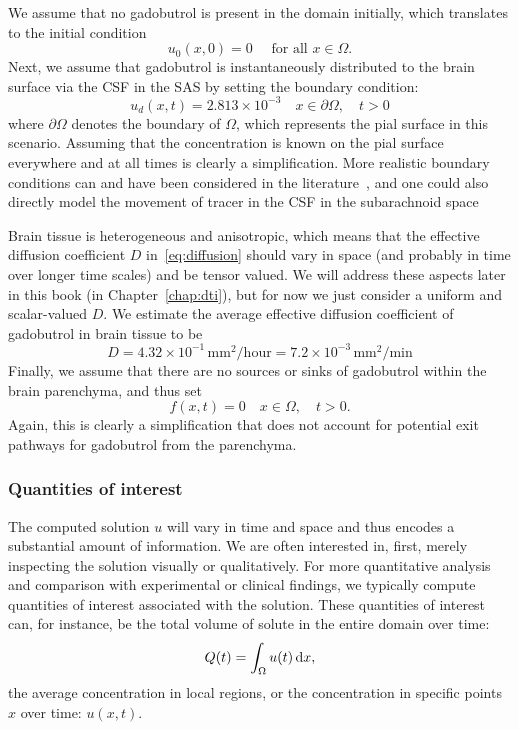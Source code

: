 We assume that no gadobutrol is present in the domain initially,
which translates to the initial condition
\begin{equation}
  \label{eq:chp3:ic}
  u_0(x, 0) = 0 \quad \text{ for all } x \in \Omega.
\end{equation}
Next, we assume that gadobutrol is instantaneously distributed to the brain 
surface via the CSF in the SAS by setting the
boundary condition:
\begin{equation}
  \label{eq:chp3:bc}
  u_d(x, t) = 2.813 \times 10^{-3} \quad x \in \partial \Omega, \quad t > 0
\end{equation}
where $\partial \Omega$ denotes the boundary of $\Omega$, which
represents the pial surface in this scenario. Assuming that the
concentration is known on the pial surface everywhere and at all times
is clearly a simplification. More realistic boundary conditions can
and have been considered in the
literature~\cite{croci2019uncertainty,valnes2020apparent}, and one
could also directly model the movement of tracer in the CSF in the
subarachnoid space~\cite{haga2017numerical,pizzichelli2017numerical}

Brain tissue is heterogeneous and anisotropic, which means that the
effective diffusion coefficient $D$ in~\eqref{eq:diffusion} should vary in
space (and probably in time over longer time scales) and be
tensor valued. We will address these aspects later in this book (in
Chapter~\ref{chap:dti}), but for now we just consider a uniform and
scalar-valued $D$. We estimate the
average effective diffusion coefficient of gadobutrol in brain tissue
to be
\begin{equation}
  D  
  = 4.32 \times 10^{-1} \, \text{mm$^2$/hour}
  = 7.2 \times 10^{-3} \, \text{mm$^2$/min}
\end{equation}
Finally, we assume that there are no sources or sinks of gadobutrol
within the brain parenchyma, and thus set
\begin{equation}
  f(x, t) = 0 \quad x \in \Omega, \quad t > 0.
\end{equation}
Again, this is clearly a simplification that does not account for
potential exit pathways for gadobutrol from the parenchyma.

\subsubsection{Quantities of interest}
The computed solution $u$ will vary in time and space and thus encodes
a substantial amount of information. We are often interested in, first,
merely inspecting the solution visually or qualitatively. For more
quantitative analysis and comparison with experimental or clinical
findings, we typically compute quantities of interest associated with
the solution. These quantities of interest can, for instance, be the
total volume of solute in the entire domain over time:
\begin{equation}
  \label{eq:chp3:qoi}
  Q(t) = \int_{\Omega} u (t) \, \mathrm{d}x, 
\end{equation}
the average concentration in local regions, or the concentration in
specific points $x$ over time: $u(x, t)$.

